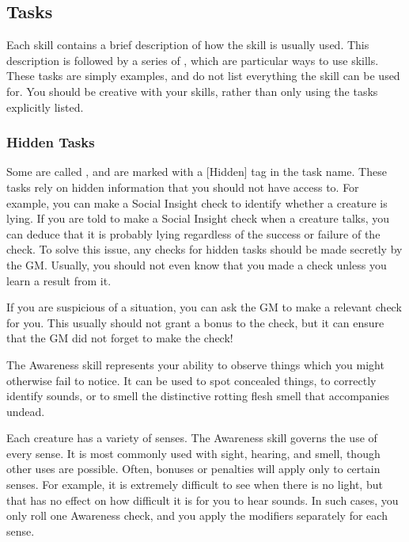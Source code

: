     \subsection{Tasks}\label{Tasks}

        Each skill contains a brief description of how the skill is usually used.
        This description is followed by a series of , which are particular ways to use skills.
        These tasks are simply examples, and do not list everything the skill can be used for.
        You should be creative with your skills, rather than only using the tasks explicitly listed.

    \subsubsection{Hidden Tasks}\label{Hidden Tasks}
        Some  are called , and are marked with a [Hidden] tag in the task name.
        These tasks rely on hidden information that you should not have access to.
        For example, you can make a Social Insight check to identify whether a creature is lying.
        If you are told to make a Social Insight check when a creature talks, you can deduce that it is probably lying regardless of the success or failure of the check.
        To solve this issue, any checks for hidden tasks should be made secretly by the GM.\@
        Usually, you should not even know that you made a check unless you learn a result from it.

        If you are suspicious of a situation, you can ask the GM to make a relevant check for you.
        This usually should not grant a bonus to the check, but it can ensure that the GM did not forget to make the check!

\newpage
{}
    The Awareness skill represents your ability to observe things which you might otherwise fail to notice. It can be used to spot concealed things, to correctly identify sounds, or to smell the distinctive rotting flesh smell that accompanies undead.

    Each creature has a variety of senses. The Awareness skill governs the use of every sense. It is most commonly used with sight, hearing, and smell, though other uses are possible. Often, bonuses or penalties will apply only to certain senses. For example, it is extremely difficult to see when there is no light, but that has no effect on how difficult it is for you to hear sounds. In such cases, you only roll one Awareness check, and you apply the modifiers separately for each sense.

